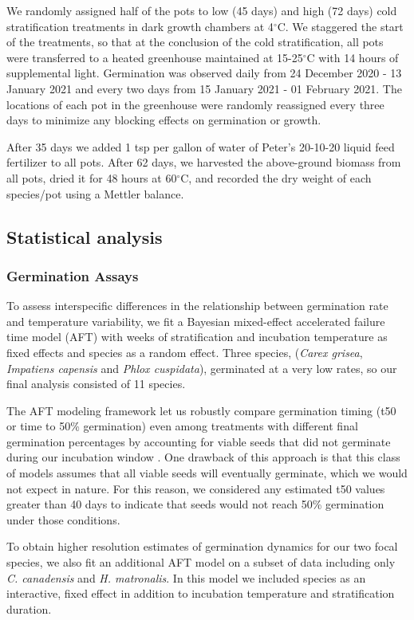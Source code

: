 \documentclass{article}[11pt]
\begin{document}
\noindent We randomly assigned half of the pots to low (45 days) and high (72 days) cold stratification treatments in dark growth chambers at 4$^{\circ}$C. We staggered the start of the treatments, so that at the conclusion of the cold stratification, all pots were transferred to a heated greenhouse maintained at 15-25$^{\circ}$C with 14 hours of supplemental light. Germination was observed daily from 24 December 2020 - 13 January 2021 and every two days from 15 January 2021 - 01 February 2021. The locations of each pot in the greenhouse were randomly reassigned every three days to minimize any blocking effects on germination or growth.

\noident After 35 days we added 1 tsp per gallon of water of Peter’s 20-10-20 liquid feed fertilizer to all pots. After 62 days, we harvested the above-ground biomass from all pots, dried it for 48 hours at 60$^{\circ}$C, and recorded the dry weight of each species/pot using a Mettler balance.

\subsection*{Statistical analysis}
\subsubsection*{Germination Assays}
To assess interspecific differences in the relationship between germination rate and temperature variability, we fit a Bayesian mixed-effect accelerated failure time model (AFT) \citep{ONOFRI:2010tl} with weeks of stratification and incubation temperature as fixed effects and species as a random effect. Three species, (\textit{Carex grisea}, \textit{Impatiens capensis} and \textit{Phlox cuspidata}), germinated at a very low rates, so our final analysis consisted of 11 species.

The AFT modeling framework let us robustly compare germination timing (t50 or time to 50\% germination) even among treatments with different final germination percentages by accounting for viable seeds that did not germinate during our incubation window \citep{Soltani:2015aa,ONOFRI:2010tl}. One drawback of this approach is that this class of models assumes that all viable seeds will eventually germinate, which we would not expect in nature. For this reason, we considered any estimated t50 values greater than 40 days to indicate that seeds would not reach 50\% germination under those conditions.  

To obtain higher resolution estimates of germination dynamics for our two focal species, we also fit an additional AFT model on a subset of data including only \textit{C. canadensis} and \textit{H. matronalis}. In this model we included species as an interactive, fixed effect in addition to incubation temperature and stratification duration. 
\end{document}
